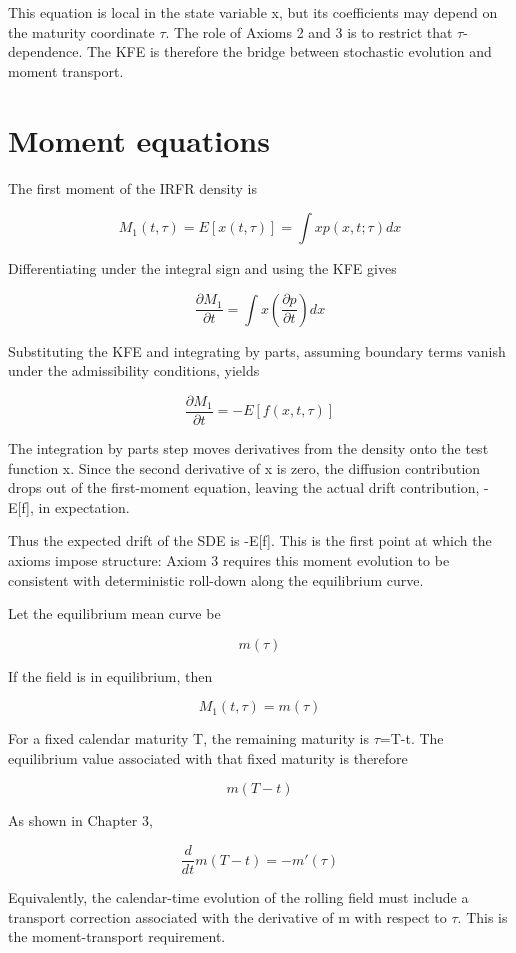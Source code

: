\documentclass[11pt,oneside]{book}
\begin{document}
This equation is local in the state variable x, but its coefficients may
depend on the maturity coordinate $\tau$. The role of Axioms 2 and 3 is to
restrict that $\tau$-dependence. The KFE is therefore the bridge between
stochastic evolution and moment transport.

\section{Moment equations}\label{moment-equations}

The first moment of the IRFR density is

\[
M_1(t,\tau) = E[x(t,\tau)] = \int x p(x,t;\tau) dx
\]

Differentiating under the integral sign and using the KFE gives

\[
\frac{\partial M_1}{\partial t} = \int x (\frac{\partial p}{\partial t}) dx
\]

Substituting the KFE and integrating by parts, assuming boundary terms
vanish under the admissibility conditions, yields

\[
\frac{\partial M_1}{\partial t} = -E[f(x,t,\tau)]
\]

The integration by parts step moves derivatives from the density onto
the test function x. Since the second derivative of x is zero, the
diffusion contribution drops out of the first-moment equation, leaving
the actual drift contribution, -E[f], in expectation.

Thus the expected drift of the SDE is -E[f]. This is the first point
at which the axioms impose structure: Axiom 3 requires this moment
evolution to be consistent with deterministic roll-down along the
equilibrium curve.

Let the equilibrium mean curve be

\[
m(\tau)
\]

If the field is in equilibrium, then

\[
M_1(t,\tau)=m(\tau)
\]

For a fixed calendar maturity T, the remaining maturity is $\tau$=T-t. The
equilibrium value associated with that fixed maturity is therefore

\[
m(T-t)
\]

As shown in Chapter 3,

\[
\frac{d}{dt} m(T-t) = -m'(\tau)
\]

Equivalently, the calendar-time evolution of the rolling field must
include a transport correction associated with the derivative of m with
respect to $\tau$. This is the moment-transport requirement.
\end{document}
